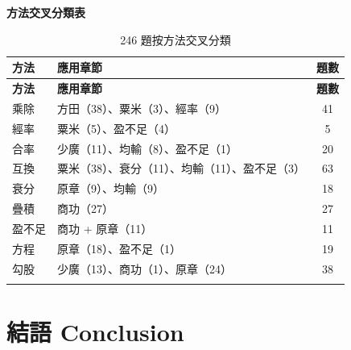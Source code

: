 \documentclass[11pt,a4paper]{article}
\begin{document}
\vspace{0.8em}

\begin{center}
{\small\textbf{方法交叉分類表}}
\end{center}
\vspace{0.3em}

\begin{center}
\begin{longtable}{|l|p{3.8cm}|c|}
\hline
\textbf{方法} & \textbf{應用章節} & \textbf{題數} \\
\hline
\endfirsthead
\hline
\textbf{方法} & \textbf{應用章節} & \textbf{題數} \\
\hline
\endhead
乘除 & 方田（38）、粟米（3）、經率（9） & 41 \\
\hline
經率 & 粟米（5）、盈不足（4） & 5 \\
\hline
合率 & 少廣（11）、均輸（8）、盈不足（1） & 20 \\
\hline
互換 & 粟米（38）、衰分（11）、均輸（11）、盈不足（3） & 63 \\
\hline
衰分 & 原章（9）、均輸（9） & 18 \\
\hline
疊積 & 商功（27） & 27 \\
\hline
盈不足 & 商功 + 原章（11） & 11 \\
\hline
方程 & 原章（18）、盈不足（1） & 19 \\
\hline
勾股 & 少廣（13）、商功（1）、原章（24） & 38 \\
\hline
\caption*{246 題按方法交叉分類}
\end{longtable}
\end{center}

\newpage

\section{結語 Conclusion}
\end{document}
